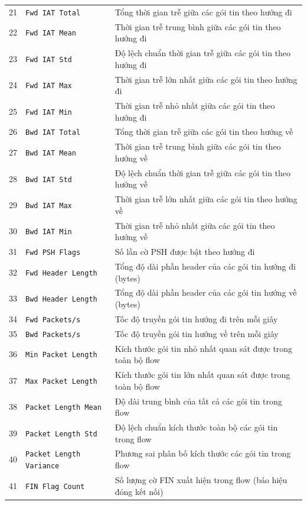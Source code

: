 \begin{longtable}{rlp{7.2cm}}
21 & \texttt{Fwd IAT Total} & Tổng thời gian trễ giữa các gói tin theo hướng đi \\
22 & \texttt{Fwd IAT Mean} & Thời gian trễ trung bình giữa các gói tin theo hướng đi \\
23 & \texttt{Fwd IAT Std} & Độ lệch chuẩn thời gian trễ giữa các gói tin theo hướng đi \\
24 & \texttt{Fwd IAT Max} & Thời gian trễ lớn nhất giữa các gói tin theo hướng đi \\
25 & \texttt{Fwd IAT Min} & Thời gian trễ nhỏ nhất giữa các gói tin theo hướng đi \\
26 & \texttt{Bwd IAT Total} & Tổng thời gian trễ giữa các gói tin theo hướng về \\
27 & \texttt{Bwd IAT Mean} & Thời gian trễ trung bình giữa các gói tin theo hướng về \\
28 & \texttt{Bwd IAT Std} & Độ lệch chuẩn thời gian trễ giữa các gói tin theo hướng về \\
29 & \texttt{Bwd IAT Max} & Thời gian trễ lớn nhất giữa các gói tin theo hướng về \\
30 & \texttt{Bwd IAT Min} & Thời gian trễ nhỏ nhất giữa các gói tin theo hướng về \\
31 & \texttt{Fwd PSH Flags} & Số lần cờ PSH được bật theo hướng đi \\
32 & \texttt{Fwd Header Length} & Tổng độ dài phần header của các gói tin hướng đi (bytes) \\
33 & \texttt{Bwd Header Length} & Tổng độ dài phần header của các gói tin hướng về (bytes) \\
34 & \texttt{Fwd Packets/s} & Tốc độ truyền gói tin hướng đi trên mỗi giây \\
35 & \texttt{Bwd Packets/s} & Tốc độ truyền gói tin hướng về trên mỗi giây \\
36 & \texttt{Min Packet Length} & Kích thước gói tin nhỏ nhất quan sát được trong toàn bộ flow \\
37 & \texttt{Max Packet Length} & Kích thước gói tin lớn nhất quan sát được trong toàn bộ flow \\
38 & \texttt{Packet Length Mean} & Độ dài trung bình của tất cả các gói tin trong flow \\
39 & \texttt{Packet Length Std} & Độ lệch chuẩn kích thước toàn bộ các gói tin trong flow \\
40 & \texttt{Packet Length Variance} & Phương sai phân bố kích thước các gói tin trong flow \\
41 & \texttt{FIN Flag Count} & Số lượng cờ FIN xuất hiện trong flow (báo hiệu đóng kết nối) \\

\end{longtable}
